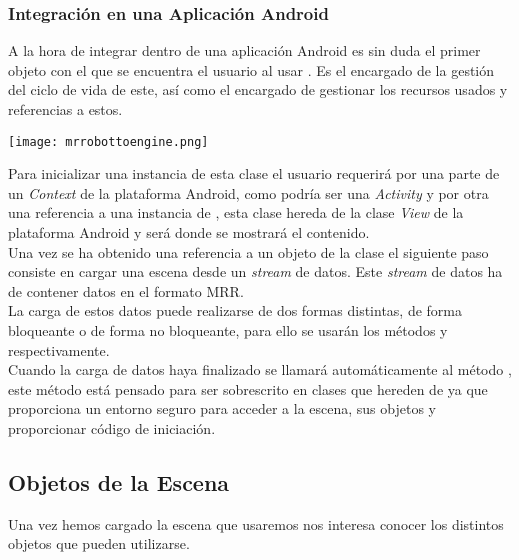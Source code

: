 \subsubsection{Integración en una Aplicación Android}

A la hora de integrar \robotto dentro de una aplicación Android \rorefrobottoengine\label{ro:robottoengine} es sin duda el primer objeto con el que se encuentra el usuario al usar \robotto. Es el encargado de la gestión del ciclo de vida de este, así como el encargado de gestionar los recursos usados y referencias a estos.\\
\begin{center}
\texttt{[image: mrrobottoengine.png]}
\end{center}

Para inicializar una instancia de esta clase el usuario requerirá por una parte de un \textit{Context} de la plataforma Android, como podría ser una \textit{Activity} y por otra una referencia a una instancia de \rorefsurfaceview\label{ro:surfaceview}, esta clase hereda de la clase \textit{View} de la plataforma Android y será donde se mostrará el contenido.\\

Una vez se ha obtenido una referencia a un objeto de la clase \rorefrobottoengine el siguiente paso consiste en cargar una escena desde un \textit{stream} de datos. Este \textit{stream} de datos ha de contener datos en el formato MRR.\\
La carga de estos datos puede realizarse de dos formas distintas, de forma bloqueante o de forma no bloqueante, para ello se usarán los métodos  y  respectivamente.\\

Cuando la carga de datos haya finalizado se llamará automáticamente al método , este método está pensado para ser sobrescrito en clases que hereden de \rorefrobottoengine ya que proporciona un entorno seguro para acceder a la escena, sus objetos y proporcionar código de iniciación.\\

\subsection{Objetos de la Escena}
Una vez hemos cargado la escena que usaremos nos interesa conocer los distintos objetos que pueden utilizarse.\\

